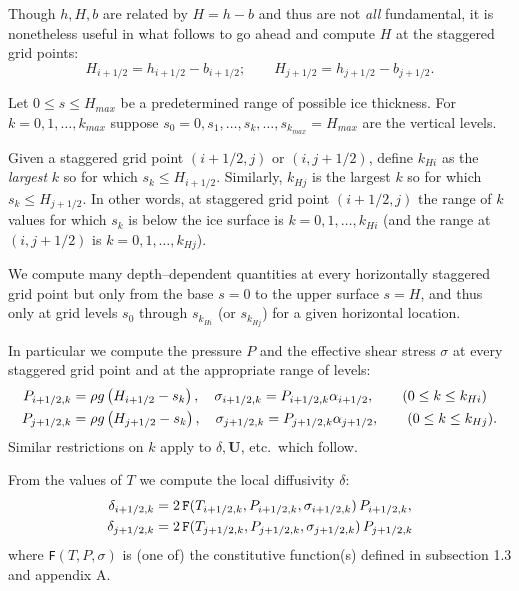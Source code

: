 \documentclass{amsart}%
\theoremstyle{plain}
\theoremstyle{definition}
\theoremstyle{remark}
\newcommand{\mtt}{\texttt}
\newcommand{\bU}{{\mathbf{U}}}
\begin{document}
Though $h,H,b$ are related by $H=h-b$ and thus are not \emph{all} fundamental, it is nonetheless useful in what follows to go ahead and compute $H$ at the staggered grid points:
\begin{equation}
    H_{i+1/2}=h_{i+1/2}-b_{i+1/2}; \qquad H_{j+1/2}=h_{j+1/2}-b_{j+1/2}.
\end{equation}

Let $0\le s \le H_{max}$ be a predetermined range of possible ice thickness.  For $k=0,1,\dots,k_{max}$ suppose $s_0=0,s_1 ,\dots,s_k,\dots,s_{k_{max}}=H_{max}$ are the vertical levels.

Given a staggered grid point $(i+1/2,j)$ or $(i,j+1/2)$, define $k_{Hi}$ as the \emph{largest} $k$ so for which $s_k\le H_{i+1/2}$.  Similarly, $k_{Hj}$ is the largest $k$ so for which $s_k\le H_{j+1/2}$.  In other words, at staggered grid point $(i+1/2,j)$ the range of $k$ values for which $s_k$ is below the ice surface is $k=0,1,\dots,k_{Hi}$ (and the range at $(i,j+1/2)$ is $k=0,1,\dots,k_{Hj}$).

We compute many depth--dependent quantities at every horizontally staggered grid point but only from the base $s=0$ to the upper surface $s=H$, and thus only at grid levels $s_0$ through $s_{k_{Hi}}$ (or $s_{k_{Hj}}$) for a given horizontal location.

In particular we compute the pressure $P$ and the effective shear stress $\sigma$ at every staggered grid point and at the appropriate range of levels:
\begin{align}
  P_{i+1/2,k}&=\rho g \left(H_{i+1/2}-s_k\right), \quad \sigma_{i+1/2,k}=P_{i+1/2,k} \alpha_{i+1/2}, \qquad (0\le k \le k_{Hi}) \\
  P_{j+1/2,k}&=\rho g \left(H_{j+1/2}-s_k\right), \quad \sigma_{j+1/2,k}=P_{j+1/2,k} \alpha_{j+1/2}, \qquad (0\le k \le k_{Hj}).\notag
\end{align}
Similar restrictions on $k$ apply to $\delta,\bU$, etc.~which follow.

From the values of $T$ we compute the local diffusivity $\delta$:
\begin{align}
\delta_{i+1/2,k}&=2 \,\mtt{F}(T_{i+1/2,k},P_{i+1/2,k}, \sigma_{i+1/2,k})\,P_{i+1/2,k}, \\
\delta_{j+1/2,k}&=2 \,\mtt{F}(T_{j+1/2,k},P_{j+1/2,k}, \sigma_{j+1/2,k})\,P_{j+1/2,k}\notag
\end{align}
where \mtt{F}$(T,P,\sigma)$ is (one of) the constitutive function(s) defined in subsection 1.3 and appendix A.
\end{document}
